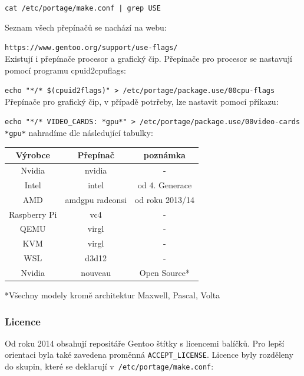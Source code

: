 \documentclass[12pt,a4paper,twoside,]{article}
\begin{document}
{\texttt{cat /etc/portage/make.conf | grep USE}

Seznam všech přepínačů se nachází na webu:

\texttt{https://www.gentoo.org/support/use-flags/}\\

Existují i přepínače procesor a grafický čip. Přepínače pro procesor se nastavují pomocí programu cpuid2cpuflags:


\texttt{echo "*/* \$(cpuid2flags)" > /etc/portage/package.use/00cpu-flags}\\

Přepínače pro grafický čip, v případě potrřeby, lze nastavit pomocí příkazu:

\texttt{echo "*/* VIDEO\_CARDS: *gpu*" > /etc/portage/package.use/00video-cards}\\

\texttt{*gpu*} nahradíme dle následující tabulky:

\begin{table}[h]
	\centering
	\begin{tabular}{|c|c|c|}
		\hline
		Výrobce & Přepínač & poznámka \\
		\hline
		Nvidia & nvidia & -\\
		\hline
		Intel & intel & od 4. Generace \\
		\hline
		AMD & amdgpu radeonsi & od roku 2013/14 \\
		\hline
		Raspberry Pi & vc4 & - \\
		\hline
		QEMU&virgl&-\\
		\hline
		KVM&virgl&-\\
		\hline
		WSL&d3d12&- \\
		\hline
		Nvidia & nouveau & Open Source*\\
		\hline
		
	\end{tabular}
\end{table}
*Všechny modely kromě architektur Maxwell, Pascal, Volta
\newpage
\subsubsection{\textsf{Licence}}
Od roku 2014 obsahují repositáře Gentoo štítky s licencemi balíčků. Pro lepší orientaci byla také zavedena proměnná \texttt{ACCEPT\_LICENSE}. Licence byly rozděleny do skupin, které se deklarují v~\texttt{/etc/portage/make.conf}:

}
\end{document}
